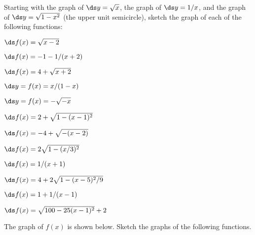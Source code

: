 \begin{exercises}

Starting with the graph of $\ds y=\sqrt{x}$, the graph of $\ds y=1/x$, and the
graph of $\ds y=\sqrt{1-x^2}$ (the upper unit semicircle), sketch the
graph of each of the following functions:

\twocol
\begin{exercise} $\ds f(x)=\sqrt{x-2}$ \end{exercise}
\begin{exercise} $\ds f(x)=-1-1/(x+2)$ \end{exercise}
\begin{exercise} $\ds f(x)=4+\sqrt{x+2}$ \end{exercise}
\begin{exercise} $\ds y=f(x)=x/(1-x)$ \end{exercise}
\begin{exercise} $\ds y=f(x)=-\sqrt{-x}$ \end{exercise}
\begin{exercise} $\ds f(x)=2+\sqrt{1-(x-1)^2}$ \end{exercise}
\begin{exercise} $\ds f(x)=-4+\sqrt{-(x-2)}$ \end{exercise}
\begin{exercise} $\ds f(x)=2\sqrt{1-(x/3)^2}$ \end{exercise}
\begin{exercise} $\ds f(x)=1/(x+1)$\end{exercise}
\begin{exercise} $\ds f(x)=4+2\sqrt{1-(x-5)^2/9}$\end{exercise}
\begin{exercise} $\ds f(x)=1+1/(x-1)$\end{exercise}
\begin{exercise} $\ds f(x)=\sqrt{100-25(x-1)^2}+2$\end{exercise}
\endtwocol

\msk
\noindent
The graph of $f(x)$ is shown below.
Sketch the graphs of the following functions.


\end{exercises}
